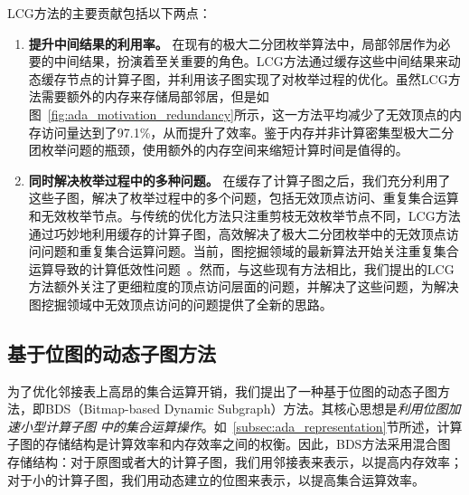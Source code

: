 \begin{example}
\end{example}

LCG方法的主要贡献包括以下两点：

\begin{enumerate}
	\item \textbf{提升中间结果的利用率。}
	在现有的极大二分团枚举算法中，局部邻居作为必要的中间结果，扮演着至关重要的角色。LCG方法通过缓存这些中间结果来动态缓存节点的计算子图，并利用该子图实现了对枚举过程的优化。虽然LCG方法需要额外的内存来存储局部邻居，但是如图~\ref{fig:ada_motivation_redundancy}所示，这一方法平均减少了无效顶点的内存访问量达到了97.1\%，从而提升了效率。鉴于内存并非计算密集型极大二分团枚举问题的瓶颈，使用额外的内存空间来缩短计算时间是值得的。
	


	\item \textbf{同时解决枚举过程中的多种问题。}
	在缓存了计算子图之后，我们充分利用了这些子图，解决了枚举过程中的多个问题，包括无效顶点访问、重复集合运算和无效枚举节点。与传统的优化方法只注重剪枝无效枚举节点不同，LCG方法通过巧妙地利用缓存的计算子图，高效解决了极大二分团枚举中的无效顶点访问问题和重复集合运算问题。当前，图挖掘领域的最新算法开始关注重复集合运算导致的计算低效性问题~\cite{Graphpi20,GPMredundancy23}。然而，与这些现有方法相比，我们提出的LCG方法额外关注了更细粒度的顶点访问层面的问题，并解决了这些问题，为解决图挖掘领域中无效顶点访问的问题提供了全新的思路。

\end{enumerate}



\subsection{基于位图的动态子图方法}
\label{subsec:ada_design_1}

为了优化邻接表上高昂的集合运算开销，我们提出了一种基于位图的动态子图方法，即BDS（Bitmap-based Dynamic Subgraph）方法。其核心思想是\emph{利用位图加速小型计算子图} \emph{中的集合运算操作}。如~\ref{subsec:ada_representation}节所述，计算子图的存储结构是计算效率和内存效率之间的权衡。因此，BDS方法采用混合图存储结构：对于原图或者大的计算子图，我们用邻接表来表示，以提高内存效率；对于小的计算子图，我们用动态建立的位图来表示，以提高集合运算效率。

